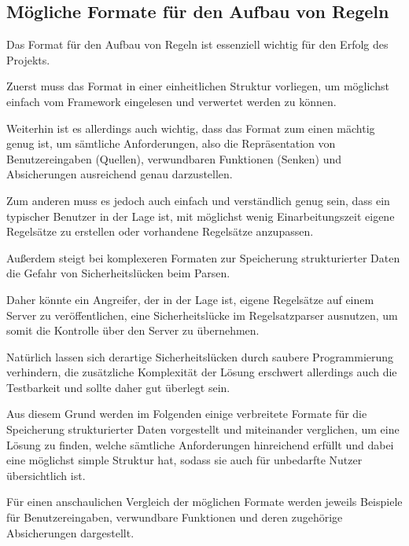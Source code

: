         \subsection{Mögliche Formate für den Aufbau von Regeln}
            Das Format für den Aufbau von Regeln ist essenziell wichtig für den Erfolg des Projekts.

            Zuerst muss das Format in einer einheitlichen Struktur vorliegen,
            um möglichst einfach vom Framework eingelesen und
            verwertet werden zu können.

            Weiterhin ist es allerdings auch wichtig,
            dass das Format zum einen mächtig genug ist,
            um sämtliche Anforderungen,
            also die Repräsentation von Benutzereingaben
            (Quellen),
            verwundbaren Funktionen
            (Senken) und
            Absicherungen ausreichend genau darzustellen.

            Zum anderen muss es jedoch auch einfach und
            verständlich genug sein,
            dass ein typischer Benutzer in der Lage ist,
            mit möglichst wenig Einarbeitungszeit eigene Regelsätze zu erstellen oder
            vorhandene Regelsätze anzupassen.

            Außerdem steigt bei komplexeren Formaten zur Speicherung strukturierter Daten die Gefahr von Sicherheitslücken beim Parsen.

            Daher könnte ein Angreifer,
            der in der Lage ist,
            eigene Regelsätze auf einem Server zu veröffentlichen,
            eine Sicherheitslücke im Regelsatzparser ausnutzen,
            um somit die Kontrolle über den Server zu übernehmen.

            Natürlich lassen sich derartige Sicherheitslücken durch saubere Programmierung verhindern,
            die zusätzliche Komplexität der Lösung erschwert allerdings auch die Testbarkeit und
            sollte daher gut überlegt sein.

            Aus diesem Grund werden im Folgenden einige verbreitete Formate für die Speicherung strukturierter Daten vorgestellt und
            miteinander verglichen,
            um eine Lösung zu finden,
            welche sämtliche Anforderungen hinreichend erfüllt und
            dabei eine möglichst simple Struktur hat,
            sodass sie auch für unbedarfte Nutzer übersichtlich ist.

            Für einen anschaulichen Vergleich der möglichen Formate werden jeweils Beispiele für Benutzereingaben,
            verwundbare Funktionen und
            deren zugehörige Absicherungen dargestellt.

